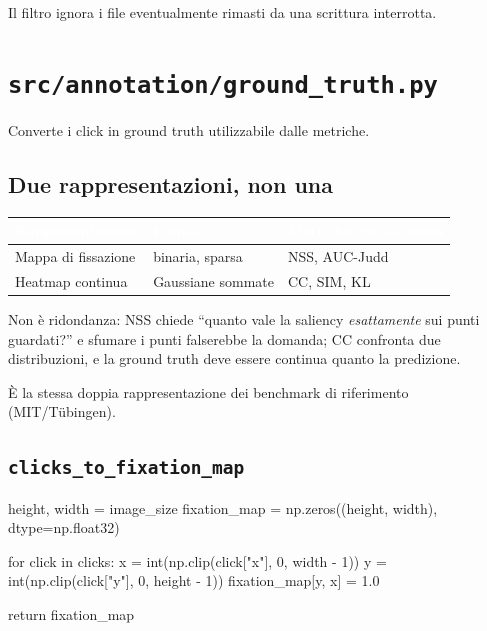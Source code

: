 Il filtro  ignora i file  eventualmente rimasti da una
scrittura interrotta.

\section{\texttt{src/annotation/ground\_truth.py}}

Converte i click in ground truth utilizzabile dalle metriche.

\subsection{Due rappresentazioni, non una}

\begin{center}
\begin{tabular}{l l p{5.8cm}}
\toprule
\rowcolor{tblHead}\textcolor{white}{\textbf{Rappresentazione}} & \textcolor{white}{\textbf{Forma}} & \textcolor{white}{\textbf{Metriche che la usano}} \\
\midrule
Mappa di fissazione & binaria, sparsa & NSS, AUC-Judd \\
\rowcolor{tblAlt} Heatmap continua & Gaussiane sommate & CC, SIM, KL \\
\bottomrule
\end{tabular}
\end{center}

Non è ridondanza: NSS chiede ``quanto vale la saliency \emph{esattamente} sui punti guardati?'' e
sfumare i punti falserebbe la domanda; CC confronta due distribuzioni, e la ground truth deve
essere continua quanto la predizione.

È la stessa doppia rappresentazione dei benchmark di riferimento (MIT/Tübingen).

\subsection{\texttt{clicks\_to\_fixation\_map}}

\begin{idebox}
\begin{pycode}
height, width = image_size
fixation_map = np.zeros((height, width), dtype=np.float32)

for click in clicks:
    x = int(np.clip(click["x"], 0, width - 1))
    y = int(np.clip(click["y"], 0, height - 1))
    fixation_map[y, x] = 1.0

return fixation_map
\end{pycode}
\end{idebox}

